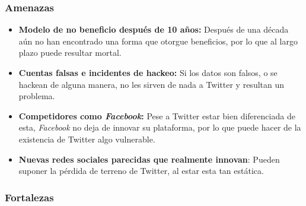 \subsubsection{Amenazas}

\begin{itemize}

\item \textbf{Modelo de no beneficio después de 10 años:} Después de una década aún no han encontrado una forma que otorgue beneficios, por lo que al largo plazo puede resultar mortal.
\item \textbf{Cuentas falsas e incidentes de hackeo:} Si los datos son falsos, o se hackean de alguna manera, no les sirven de nada a Twitter y resultan un problema.
\item \textbf{Competidores como \textit{Facebook}:} Pese a Twitter estar bien diferenciada de esta, \textit{Facebook} no deja de innovar su plataforma, por lo que puede hacer de la existencia de Twitter algo vulnerable.
\item \textbf{Nuevas redes sociales parecidas que realmente innovan}: Pueden suponer la pérdida de terreno de Twitter, al estar esta tan estática.

\end{itemize}

\subsubsection{Fortalezas}

